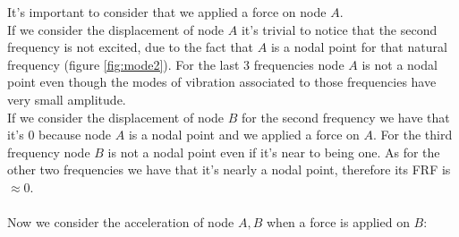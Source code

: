 \documentclass[10pt,a4paper,final]{report}
\begin{document}
It's important to consider that we applied a force on node $A$. \\If we consider the displacement of node $A$ it's trivial to notice that the second frequency is not excited, due to the fact that $A$ is a nodal point for that natural frequency (figure \ref{fig:mode2}). For the last 3 frequencies node $ A$ is not a nodal point even though the modes of vibration associated to those frequencies have very small amplitude. \\If we consider the displacement of node $B$ for the second frequency we have that it's $0$ because node $A$ is a nodal point and we applied a force on $A$. For the third frequency node $B$ is not a nodal point even if it's near to being one. As for the other two frequencies we have that it's nearly a nodal point, therefore its FRF is $\approx 0$. \\ \\
Now we consider the acceleration of node $A,B$ when a force is applied on $B$:
\end{document}
